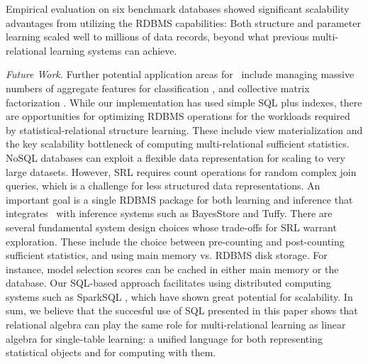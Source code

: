 \documentclass{IEEEtran}
\begin{document}
Empirical evaluation on six benchmark databases showed significant scalability advantages from utilizing the RDBMS capabilities: Both structure and parameter learning scaled well to millions of data records, beyond what previous multi-relational learning systems can achieve. 

{\em Future Work.} Further potential application areas for \FB\ include managing massive numbers of aggregate features for classification \cite{Popescul2007}, and collective matrix factorization \cite{Singh2008,Singh2013}. 
While our implementation has used simple SQL plus indexes, there are opportunities for optimizing RDBMS operations for the workloads required by statistical-relational structure learning. These include view materialization and the key scalability bottleneck of computing multi-relational sufficient statistics. NoSQL databases can exploit a flexible data representation for scaling to very large datasets. However, SRL requires count operations for random complex join queries, which is a challenge for less structured data representations. An important goal is a single RDBMS package for both learning and inference that integrates \FB\ with inference systems such as BayesStore and Tuffy. 
%
There are several fundamental system design choices whose trade-offs for SRL warrant exploration. These include the choice between pre-counting and post-counting sufficient statistics, and using main memory vs. RDBMS disk storage. For instance, model selection scores can be cached in either main memory or the database. Our SQL-based approach facilitates using distributed computing systems such as SparkSQL \cite{Michael2015}, which have shown great potential for scalability. 
In sum, we believe that the succesful use of SQL presented in this paper shows that relational algebra can play the same role for multi-relational learning as linear algebra for single-table learning: a unified language for both representing statistical objects and for computing with them.
\end{document}
